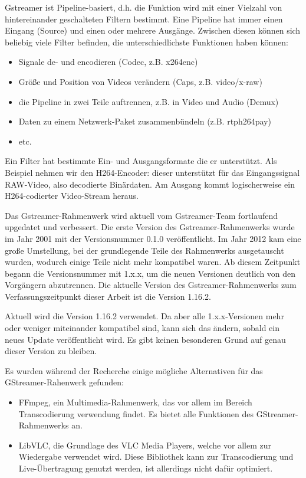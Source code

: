Gstreamer ist Pipeline-basiert, d.h. die Funktion wird mit einer Vielzahl von hintereinander geschalteten Filtern bestimmt.
Eine Pipeline hat immer einen Eingang (Source) und einen oder mehrere Ausgänge.
Zwischen diesen können sich beliebig viele Filter befinden, die unterschiedlichste Funktionen haben können:
\begin{itemize}
    \item Signale de- und encodieren (Codec, z.B. x264enc)
    \item Größe und Position von Videos verändern (Caps, z.B. video/x-raw)
    \item die Pipeline in zwei Teile auftrennen, z.B. in Video und Audio (Demux)
    \item Daten zu einem Netzwerk-Paket zusammenbündeln (z.B. rtph264pay)
    \item etc.
\end{itemize}
Ein Filter hat bestimmte Ein- und Ausgangsformate die er unterstützt.
Als Beispiel nehmen wir den H264-Encoder:
dieser unterstützt für das Eingangssignal RAW-Video, also decodierte Binärdaten. Am Ausgang kommt logischerweise ein H264-codierter Video-Stream heraus.\par

Das Gstreamer-Rahmenwerk wird aktuell vom Gstreamer-Team fortlaufend upgedatet und verbessert.
Die erste Version des Gstreamer-Rahmenwerks wurde im Jahr 2001 mit der Versionsnummer 0.1.0 veröffentlicht.
Im Jahr 2012 kam eine große Umstellung, bei der grundlegende Teile des Rahmenwerks ausgetauscht wurden, wodurch einige Teile nicht mehr kompatibel waren.
Ab diesem Zeitpunkt begann die Versionsnummer mit 1.x.x, um die neuen Versionen deutlich von den Vorgängern abzutrennen.
Die aktuelle Version des Gstreamer-Rahmenwerks zum Verfassungszeitpunkt dieser Arbeit ist die Version 1.16.2.\par

Aktuell wird die Version 1.16.2 verwendet. Da aber alle 1.x.x-Versionen mehr oder weniger miteinander kompatibel sind, kann sich das ändern, sobald ein neues Update veröffentlicht wird. Es gibt keinen besonderen Grund auf genau dieser Version zu bleiben.\par

Es wurden während der Recherche einige mögliche Alternativen für das GStreamer-Rahenwerk gefunden:
\begin{itemize}
    \item FFmpeg, ein Multimedia-Rahmenwerk, das vor allem im Bereich Transcodierung verwendung findet. Es bietet alle Funktionen des GStreamer-Rahmenwerks an.
    \item LibVLC, die Grundlage des VLC Media Players, welche vor allem zur Wiedergabe verwendet wird. Diese Bibliothek kann zur Transcodierung und Live-Übertragung genutzt werden, ist allerdings nicht dafür optimiert.
\end{itemize}

